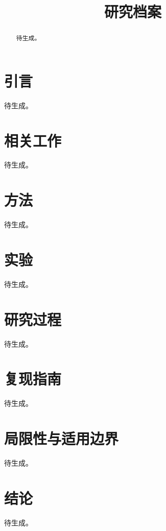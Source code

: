 \documentclass[lang=cn,a4paper,bibend=biber]{elegantpaper}
\title{研究档案}
\author{}
\institute{}
\date{}
\begin{document}
\maketitle

\begin{abstract}
待生成。
\end{abstract}

\section{引言}
待生成。

\section{相关工作}
待生成。

\section{方法}
待生成。

\section{实验}
待生成。

\section{研究过程}
待生成。

\section{复现指南}
待生成。

\section{局限性与适用边界}
待生成。

\section{结论}
待生成。

\printbibliography[heading=bibintoc,title=\ebibname]
\end{document}
